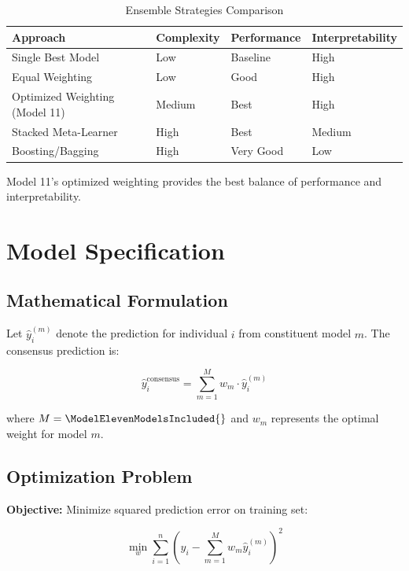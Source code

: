 \begin{table}[ht]
\centering
\caption{Ensemble Strategies Comparison}
\begin{tabular}{llll}
\toprule
\textbf{Approach} & \textbf{Complexity} & \textbf{Performance} & \textbf{Interpretability} \\
\midrule
Single Best Model & Low & Baseline & High \\
Equal Weighting & Low & Good & High \\
Optimized Weighting (Model 11) & Medium & Best & High \\
Stacked Meta-Learner & High & Best & Medium \\
Boosting/Bagging & High & Very Good & Low \\
\bottomrule
\end{tabular}
\end{table}

Model 11's optimized weighting provides the best balance of performance and interpretability.

\section{Model Specification}

\subsection{Mathematical Formulation}

Let $\hat{y}_i^{(m)}$ denote the prediction for individual $i$ from constituent model $m$. The consensus prediction is:

\begin{equation}\label{eq:consensus}
\hat{y}_i^{\text{consensus}} = \sum_{m=1}^{M} w_m \cdot \hat{y}_i^{(m)}
\end{equation}

where $M = \ModelElevenModelsIncluded{}$ and $w_m$ represents the optimal weight for model $m$.

\subsection{Optimization Problem}

\textbf{Objective:} Minimize squared prediction error on training set:

\begin{equation}\label{eq:objective}
\min_{w} \sum_{i=1}^{n} \left( y_i - \sum_{m=1}^{M} w_m \hat{y}_i^{(m)} \right)^2
\end{equation}

